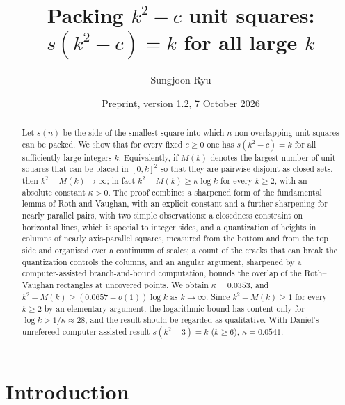 \documentclass[11pt]{amsart}
\title[Unbounded deficiency for unit squares at integer side]{Packing $k^2-c$ unit squares: \\ $s(k^2-c)=k$ for all large $k$}
\author{Sungjoon Ryu}
\date{Preprint, version 1.2, 7 October 2026}
\theoremstyle{definition}
\theoremstyle{remark}
\begin{document}
\begin{abstract}
Let $s(n)$ be the side of the smallest square into which $n$ non-overlapping unit squares can be packed.
We show that for every fixed $c\ge 0$ one has $s(k^2-c)=k$ for all sufficiently large integers $k$.
Equivalently, if $M(k)$ denotes the largest number of unit squares that can be placed in $[0,k]^2$ so that they are
pairwise disjoint as closed sets, then $k^2-M(k)\to\infty$; in fact $k^2-M(k)\ge \kappa\log k$ for every $k\ge2$,
with an absolute constant $\kappa>0$.
The proof combines a sharpened form of the fundamental lemma of Roth and Vaughan, with an explicit constant and a
further sharpening for nearly parallel pairs, with two simple observations: a closedness constraint on horizontal
lines, which is special to integer sides, and a quantization of heights in columns of nearly axis-parallel squares,
measured from the bottom and from the top side and organised over a continuum of scales; a count of the cracks that can
break the quantization controls the columns, and an angular argument, sharpened by a computer-assisted branch-and-bound
computation, bounds the overlap of the Roth--Vaughan rectangles at uncovered points. We obtain $\kappa=0.0353$, and
$k^2-M(k)\ge(0.0657-o(1))\log k$ as $k\to\infty$. Since $k^2-M(k)\ge1$ for every $k\ge2$ by an
elementary argument, the logarithmic bound has content only for $\log k>1/\kappa\approx28$, and the result should be
regarded as qualitative. With Daniel's unrefereed computer-assisted result $s(k^2-3)=k$ ($k\ge6$), $\kappa=0.0541$.
\end{abstract}

\maketitle

\section{Introduction}
\end{document}
